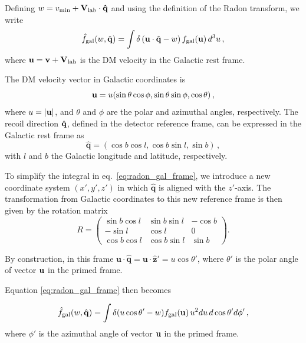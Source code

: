 \documentclass[a4paper,11pt]{article}
\begin{document}
Defining $w=v_{\rm min} + \bf{V}_{\rm{lab}}\cdot \hat{\bf{q}}$ and using the definition of the Radon transform, we  write
\begin{equation}
    \hat{f}_{\rm{gal}}(w,\hat{\mathbf{q}}) = \int \delta \left(\mathbf{u}\cdot\hat{\mathbf{q}} - w\right)f_{\rm{gal}}(\mathbf{u})\,d^3u\,,
    \label{eq:radon_gal_frame}
\end{equation}
where ${\bf u}={\bf v}+{\bf V}_{\rm lab}$ is the DM velocity in the Galactic rest frame.



The  DM velocity vector in Galactic coordinates is 
\begin{equation}
{\bf u}=u(\sin\theta \cos\phi, \sin\theta \sin\phi, \cos\theta)\, , 
\end{equation}
where $u=|{\bf u}|$, and $\theta$ and $\phi$ are the polar and azimuthal angles, respectively. The recoil direction $\hat{\bf q}$, defined in the detector reference frame,  can be expressed in the Galactic rest frame as
\begin{equation}
\hat{\mathbf{q}} = (\cos b \cos l, \cos b \sin l, \sin b)\, ,
\end{equation}
 with $l$ and $b$ the Galactic longitude and latitude, respectively.


To simplify the integral in eq.~\eqref{eq:radon_gal_frame}, we introduce a new coordinate system $(x',y',z')$ in which   $\hat{\mathbf{q}}$ is aligned with the $z'$-axis. The transformation from Galactic coordinates to this new reference frame is then given by the rotation matrix
\begin{equation}
\label{eq:rot_matrix}
R = \begin{pmatrix}
\sin b \cos l & \sin b \sin l & - \cos b \\
- \sin l & \cos l & 0 \\
\cos b \cos l & \cos b \sin l & \sin b
\end{pmatrix}.
\end{equation}

 By construction, in this  frame  $\mathbf{u}\cdot\hat{\mathbf{q}} = \mathbf{u} \cdot \hat{\mathbf{z}}' = u \cos \theta'$, where $\theta'$ is the polar angle of vector ${\bf u}$  in the primed  frame.
 
 Equation \eqref{eq:radon_gal_frame} then  becomes
  
\begin{equation}
\label{eq:radon_new_frame}
\hat{f}_{\rm gal}(w,\hat{\mathbf{q}}) = \int \delta(u \cos\theta' - w)f_{\rm{gal}}(\mathbf{u})\,u^2 du\, d\cos\theta' d\phi'\,,
\end{equation}
where $\phi'$ is the azimuthal angle of vector ${\bf u}$  in the primed  frame.
\end{document}
